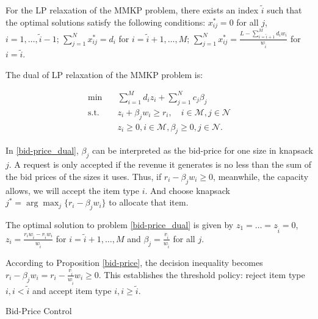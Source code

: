 \begin{lem}\label{sol_relax_deter}
For the LP relaxation of the \textup{MMKP} problem, there exists an index $\tilde{i}$ such that the optimal solutions satisfy the following conditions: $x_{ij}^{*} = 0$ for all $j$, $i = 1,\ldots, \tilde{i}-1$; $\sum_{j=1}^{N} x_{ij}^{*} = d_{i}$ for $i = \tilde{i}+1,\ldots, M$; $\sum_{j=1}^{N} x_{ij}^{*} = \frac{L - \sum_{i = \tilde{i}+1}^{M} {d_i w_i}}{w_{\tilde{i}}}$ for $i = \tilde{i}$.
\end{lem}

The dual of LP relaxation of the MMKP problem is:

\begin{equation}\label{bid-price_dual}
    \begin{aligned}
    \min \quad & \sum_{i=1}^{M} d_i z_i + \sum_{j= 1}^{N} c_j \beta_{j} \\
    \text {s.t.} \quad & z_{i} + \beta_j w_i \geq r_i, \quad i \in \mathcal{M}, j \in \mathcal{N} \\
    & z_{i} \geq 0, i \in \mathcal{M}, \beta_{j} \geq 0, j \in \mathcal{N}.
    \end{aligned}
  \end{equation}

In \eqref{bid-price_dual}, $\beta_{j}$ can be interpreted as the bid-price for one size in knapsack $j$. A request is only accepted if the revenue it generates is no less than the sum of the bid prices of the sizes it uses. Thus, if $r_i -\beta_{j} w_i \geq 0$, meanwhile, the capacity allows, we will accept the item type $i$. And choose knapsack $j^{*} = \arg \max_{j} \{r_i -\beta_{j} w_i\}$ to allocate that item.

\begin{prop}\label{bid-price}
The optimal solution to problem \eqref{bid-price_dual} is given by $z_1 = \ldots = z_{\tilde{i}} =0$, $z_{i} = \frac{r_{i} w_{\tilde{i}} - r_{\tilde{i}} w_{i}}{w_{\tilde{i}}}$ for $i = \tilde{i}+1, \ldots, M$ and $\beta_j = \frac{r_{\tilde{i}}}{w_{\tilde{i}}}$ for all $j$.
\end{prop}

According to Proposition \ref{bid-price}, the decision inequality becomes $r_i -\beta_{j} w_i = r_{i} - \frac{r_{\tilde{i}}}{w_{\tilde{i}}} w_{i} \geq 0$. This establishes the threshold policy: reject item type $i, i < \tilde{i}$ and accept item type $i, i \geq \tilde{i}$.

\begin{algorithm}[H]
    \caption{Bid-Price Control}\label{algo_bid}
\end{algorithm}

